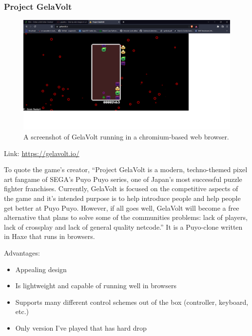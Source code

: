 \documentclass{article}
\begin{document}
\subsubsection{Project GelaVolt}

\begin{figure}[h]
\centering
\includegraphics[width=1\textwidth]{gelavolt.png}
\caption{\label{fig:gelavolt}A screenshot of GelaVolt running in a chromium-based web browser.}
\end{figure}
Link: \href{https://gelavolt.io/}{https://gelavolt.io/}

To quote the game’s creator, “Project GelaVolt is a modern, techno-themed pixel art fangame of SEGA's Puyo Puyo series, one of Japan's most successful puzzle fighter franchises. Currently, GelaVolt is focused on the competitive aspects of the game and it's intended purpose is to help introduce people and help people get better at Puyo Puyo. However, if all goes well, GelaVolt will become a free alternative that plans to solve some of the communities problems: lack of players, lack of crossplay and lack of general quality netcode.” It is a Puyo-clone written in Haxe that runs in browsers.
\vspace{0.3cm}

Advantages:

\begin{itemize}
    \renewcommand\labelitemi{--}
    \item Appealing design
    \item Is lightweight and capable of running well in browsers
    \item Supports many different control schemes out of the box (controller, keyboard, etc.)
    \item Only version I’ve played that has hard drop
\end{itemize}
\end{document}

